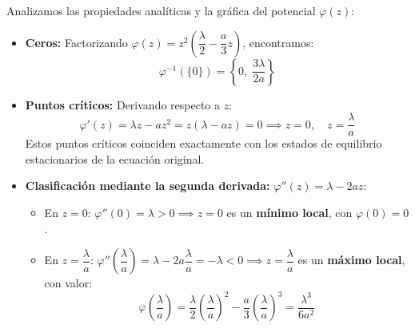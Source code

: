 {    Analizamos las propiedades analíticas y la gráfica del potencial $\varphi(z)$:
    \begin{itemize}
        \item \textbf{Ceros:} Factorizando $\varphi(z) = z^2 \left( \dfrac{\lambda}{2} - \dfrac{a}{3} z \right)$, encontramos:
        \[
            \varphi^{-1}(\{0\}) = \left\{ 0, \; \frac{3\lambda}{2a} \right\}
        \]
        \item \textbf{Puntos críticos:} Derivando respecto a $z$:
        \[
            \varphi'(z) = \lambda z - a z^2 = z(\lambda - a z) = 0 \implies z = 0, \quad z = \frac{\lambda}{a}
        \]
        Estos puntos críticos coinciden exactamente con los estados de equilibrio estacionarios de la ecuación original.
        \item \textbf{Clasificación mediante la segunda derivada:} $\varphi''(z) = \lambda - 2az$:
        \begin{itemize}
            \item En $z = 0$: $\varphi''(0) = \lambda > 0 \implies z = 0$ es un \textbf{mínimo local}, con $\varphi(0) = 0$.
            \item En $z = \dfrac{\lambda}{a}$: $\varphi''\left(\dfrac{\lambda}{a}\right) = \lambda - 2a \dfrac{\lambda}{a} = -\lambda < 0 \implies z = \dfrac{\lambda}{a}$ es un \textbf{máximo local}, con valor:
            \[
                \varphi\left(\frac{\lambda}{a}\right) = \frac{\lambda}{2}\left(\frac{\lambda}{a}\right)^2 - \frac{a}{3}\left(\frac{\lambda}{a}\right)^3 = \frac{\lambda^3}{6a^2}
            \]
        \end{itemize}
    \end{itemize}

    \begin{center}
\end{center}}
